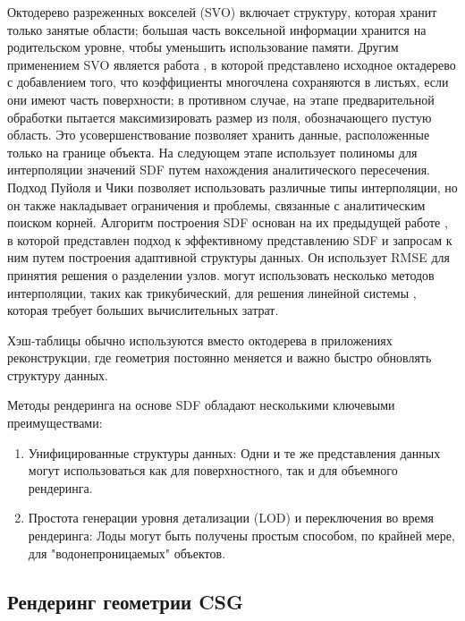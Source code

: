 \documentclass[a4paper,hidelinks,12pt]{article}
\begin{document}
Октодерево разреженных вокселей (SVO) \cite{octree_old} включает структуру, которая хранит только 
занятые области; большая часть воксельной информации хранится на родительском уровне, чтобы уменьшить 
использование памяти. Другим применением SVO является работа \cite{octree_analytic}, в которой представлено исходное 
октадерево с добавлением того, что коэффициенты многочлена сохраняются в листьях, если они имеют часть поверхности; 
в противном случае, на этапе предварительной обработки \cite{octree_analytic} пытается максимизировать размер из поля, 
обозначающего пустую область. Это усовершенствование позволяет хранить данные, расположенные только на границе объекта. 
На следующем этапе \cite{octree_analytic} использует полиномы для интерполяции значений SDF путем нахождения аналитического 
пересечения. Подход Пуйоля и Чики позволяет использовать различные типы интерполяции, но он также накладывает ограничения 
и проблемы, связанные с аналитическим поиском корней. Алгоритм построения SDF основан на их предыдущей работе \cite{aasdf}, 
в которой представлен подход к эффективному представлению SDF и запросам к ним путем построения адаптивной структуры данных. 
Он использует RMSE для принятия решения о разделении узлов. \cite{aasdf} могут использовать несколько 
методов интерполяции, таких как трикубический, для решения линейной системы \cite{titd}, 
которая требует больших вычислительных затрат.

Хэш-таблицы \cite{hashgrid} обычно используются вместо октодерева в приложениях 
реконструкции, где геометрия постоянно меняется и важно быстро обновлять структуру данных.

Методы рендеринга на основе SDF обладают несколькими ключевыми преимуществами:
\begin{enumerate}
	\item Унифицированные структуры данных: Одни и те же представления данных могут использоваться как для поверхностного, так и для объемного рендеринга.
	\item Простота генерации уровня детализации (LOD) и переключения во время рендеринга: Лоды могут быть получены простым способом, по крайней мере, для "водонепроницаемых" объектов.
\end{enumerate}

\subsection{Рендеринг геометрии CSG}
\end{document}
